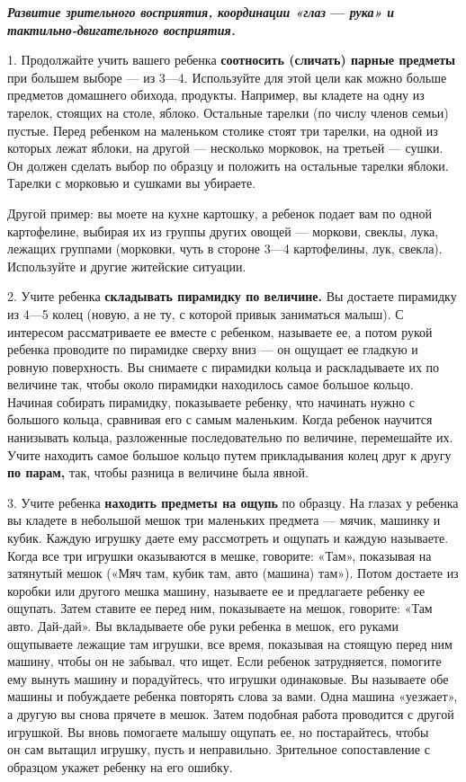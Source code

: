 \documentclass{book}
\renewcommand{\emph}[1]{\textit{#1}}
\begin{document}
\textbf{\emph{Развитие зрительного восприятия, координации «глаз} ---
\emph{рука» и тактильно-двигательного восприятия.}}

1. Продолжайте учить вашего ребенка \textbf{соотносить (сличать) парные
предметы} при большем выборе --- из 3---4. Используйте для этой цели как
можно больше предметов домашнего обихода, продукты. Например, вы кладете
на одну из тарелок, стоящих на столе, яблоко. Остальные тарелки (по
числу членов семьи) пустые. Перед ребенком на маленьком столике стоят
три тарелки, на одной из которых лежат яблоки, на другой --- несколько
морковок, на третьей --- сушки. Он должен сделать выбор по образцу и
положить на остальные тарелки яблоки. Тарелки с морковью и сушками вы
убираете.

Другой пример: вы моете на кухне картошку, а ребенок подает вам по одной
картофелине, выбирая их из группы других овощей --- моркови, свеклы,
лука, лежащих группами (морковки, чуть в стороне 3---4 картофелины, лук,
свекла). Используйте и другие житейские ситуации.

2. Учите ребенка \textbf{складывать пирамидку по величине.} Вы достаете
пирамидку из 4---5 колец (новую, а не ту, с которой привык заниматься
малыш). С интересом рассматриваете ее вместе с ребенком, называете ее, а
потом рукой ребенка проводите по пирамидке сверху вниз --- он ощущает ее
гладкую и ровную поверхность. Вы снимаете с пирамидки кольца и
раскладываете их по величине так, чтобы около пирамидки находилось самое
большое кольцо. Начиная собирать пирамидку, показываете ребенку, что
начинать нужно с большого кольца, сравнивая его с самым маленьким. Когда
ребенок научится нанизывать кольца, разложенные последовательно по
величине, перемешайте их. Учите находить самое большое кольцо путем
прикладывания колец друг к другу \textbf{по парам,} так, чтобы разница в
величине была явной.

3. Учите ребенка \textbf{находить предметы на ощупь} по образцу. На
глазах у ребенка вы кладете в небольшой мешок три маленьких предмета ---
мячик, машинку и кубик. Каждую игрушку даете ему рассмотреть и ощупать и
каждую называете. Когда все три игрушки оказываются в мешке, говорите:
«Там», показывая на затянутый мешок («Мяч там, кубик там, авто (машина)
там»). Потом достаете из коробки или другого мешка машину, называете ее
и предлагаете ребенку ее ощупать. Затем ставите ее перед ним,
показываете на мешок, говорите: «Там авто. Дай-дай». Вы вкладываете обе
руки ребенка в мешок, его руками ощупываете лежащие там игрушки, все
время, показывая на стоящую перед ним машину, чтобы он не забывал, что
ищет. Если ребенок затрудняется, помогите ему вынуть машину и
порадуйтесь, что игрушки одинаковые. Вы называете обе машины и
побуждаете ребенка повторять слова за вами. Одна машина «уезжает», а
другую вы снова прячете в мешок. Затем подобная работа проводится с
другой игрушкой. Вы вновь помогаете малышу ощупать ее, но постарайтесь,
чтобы\\
он сам вытащил игрушку, пусть и неправильно. Зрительное сопоставление с
образцом укажет ребенку на его ошибку.
\end{document}
